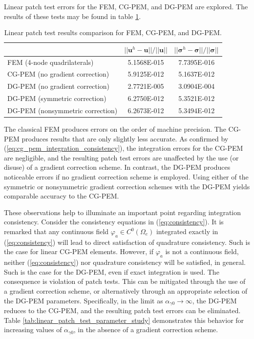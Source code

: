 Linear patch test errors for the FEM, CG-PEM, and DG-PEM are explored. The results of these tests may be found in table \ref{tab:linear_patch_test}.

\begin{table}[!ht]
  \begin{center}
    \begin{tabular}{| l || c | c |}
    \hline
           & $||\mathbf{u}^h - \mathbf{u}|| / ||\mathbf{u}||$ & $||\boldsymbol{\sigma}^h - \boldsymbol{\sigma}|| / ||\boldsymbol{\sigma}||$ \\ \hline \hline
    FEM (4-node quadrilaterals) & 5.1568E-015 & 7.7395E-016 \\ \hline
    CG-PEM (no gradient correction) & 5.9125E-012 & 5.1637E-012 \\ \hline
    DG-PEM (no gradient correction) & 2.7721E-005 & 3.0904E-004 \\ \hline
    DG-PEM (symmetric correction) & 6.2750E-012 & 5.3521E-012 \\ \hline
    DG-PEM (nonsymmetric correction) & 6.2673E-012 & 5.3494E-012 \\
    \hline
    \end{tabular}
    \caption{Linear patch test results comparison for FEM, CG-PEM, and DG-PEM.}
    \vspace{-5pt}
    \label{tab:linear_patch_test}
    \vspace{-10pt}
  \end{center}
\end{table}

The classical FEM produces errors on the order of machine precision. The CG-PEM produces results that are only slightly less accurate. As confirmed by (\ref{eq:cg_pem_integration_consistency}), the integration errors for the CG-PEM are negligible, and the resulting patch test errors are unaffected by the use (or disuse) of a gradient correction scheme. In contrast, the DG-PEM produces noticeable errors if no gradient correction scheme is employed. Using either of the symmetric or nonsymmetric gradient correction schemes with the DG-PEM yields comparable accuracy to the CG-PEM.

These observations help to illuminate an important point regarding integration consistency. Consider the consistency equations in (\ref{eq:consistency}). It is remarked that any continuous field $\varphi_a \in C^0 (\Omega_e)$ integrated exactly in (\ref{eq:consistency}) will lead to direct satisfaction of quadrature consistency. Such is the case for linear CG-PEM elements. However, if $\varphi_a$ is not a continuous field, neither (\ref{eq:consistency}) nor quadrature consistency will be satisfied, in general. Such is the case for the DG-PEM, even if exact integration is used. The consequence is violation of patch tests. This can be mitigated through the use of a gradient correction scheme, or alternatively through an appropriate selection of the DG-PEM parameters. Specifically, in the limit as $\alpha_{\gamma0} \rightarrow \infty$, the DG-PEM reduces to the CG-PEM, and the resulting patch test errors can be eliminated. Table \ref{tab:linear_patch_test_parameter_study} demonstrates this behavior for increasing values of $\alpha_{\gamma0}$, in the absence of a gradient correction scheme.

